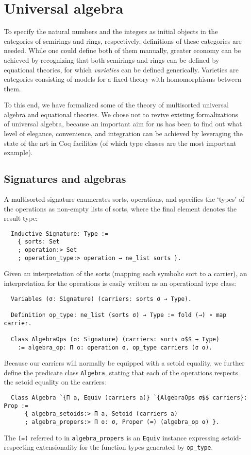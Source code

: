 \documentclass[a4paper,10pt,runningheads]{llncs}
\begin{document}
\section{Universal algebra}\label{univ}

To specify the natural numbers and the integers as initial objects in the categories of semirings and rings, respectively, definitions of these categories are needed. While one could define both of them manually, greater economy can be achieved by recognizing that both semirings and rings can be defined by equational theories, for which \emph{varieties} can be defined generically. Varieties are categories consisting of models for a fixed theory with homomorphisms between them.

To this end, we have formalized some of the theory of multisorted universal algebra and equational theories. We chose not to revive existing formalizations~\cite{DBLP:conf/tphol/Capretta99,dominguez2008formalizing} of universal algebra, because an important aim for us has been to find out what level of elegance, convenience, and integration can be achieved by leveraging the state of the art in Coq facilities (of which type classes are the most important example).

\subsection{Signatures and algebras}

A multisorted signature enumerates sorts, operations, and specifies the `types' of the operations as non-empty lists of sorts, where the final element denotes the result type:
\begin{lstlisting}
  Inductive Signature: Type :=
    { sorts: Set
    ; operation:> Set
    ; operation_type:> operation → ne_list sorts }.
\end{lstlisting}
Given an interpretation of the sorts (mapping each symbolic sort to a carrier), an interpretation for the operations is easily written as an operational type class:
\begin{lstlisting}
  Variables (σ: Signature) (carriers: sorts σ → Type).

  Definition op_type: ne_list (sorts σ) → Type := fold (→) ∘ map carrier.

  Class AlgebraOps (σ: Signature) (carriers: sorts σ$$ → Type)
    := algebra_op: Π o: operation σ, op_type carriers (σ o).
\end{lstlisting}
Because our carriers will normally be equipped with a setoid equality, we further define the predicate class \lstinline|Algebra|, stating that each of the operations respects the setoid equality on the carriers:
\begin{lstlisting}
  Class Algebra `{Π a, Equiv (carriers a)} `{AlgebraOps σ$$ carriers}: Prop :=
      { algebra_setoids:> Π a, Setoid (carriers a)
      ; algebra_propers:> Π o: σ, Proper (=) (algebra_op o) }.
\end{lstlisting}
The \lstinline|(=)| referred to in \lstinline|algebra_propers| is an \lstinline|Equiv| instance expressing setoid-respecting extensionality for the function types generated by \lstinline|op_type|.
\end{document}
